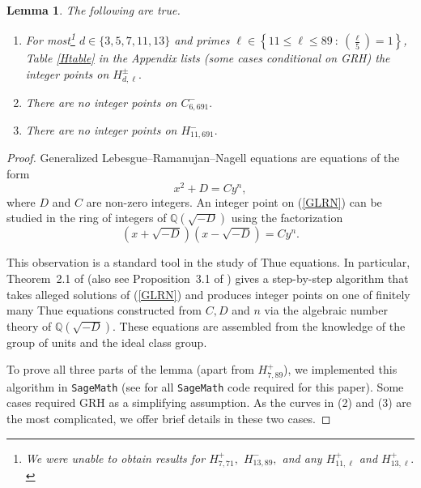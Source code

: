 \documentclass[12pt]{amsart}
\newtheorem{lem}{Lemma}[section]
\newcommand{\Q}{\mathbb{Q}}
\newcommand{\?}{\color{red}?}
\newcommand{\leg}[2]{\genfrac{(}{)}{}{}{#1}{#2}}
\numberwithin{equation}{section}
\begin{document}
\begin{lem}\label{Hyper11_19} The following are true.
\begin{enumerate}
\item
For most\footnote{We were unable to obtain results for $H_{7,71}^{+},$
$H_{13,89}^{-},$ and any $H^{+}_{11,\ell}$ and $H^{+}_{13,\ell}.$}
$d\in \{3, 5, 7, 11, 13\}$ and primes $\ell \in \left\{ 11\leq \ell \leq 89\ : \ \leg{\ell}{5}=1\right\}$,
Table \ref{Htable} in the Appendix lists (some cases conditional on GRH) the integer points on $H^{\pm}_{d,\ell}.$
\item There are no integer points on $C^{-}_{6,691}.$
\item There are no integer points on $H^{-}_{11,691}.$
\end{enumerate}
\end{lem}
\begin{proof}
Generalized Lebesgue--Ramanujan--Nagell equations are  equations of the form
\begin{equation}\label{GLRN}
x^2+D=Cy^n,
\end{equation}
where $D$ and $C$ are non-zero integers. An integer point on (\ref{GLRN}) can be studied in the ring of integers
of $\Q(\sqrt{-D})$
using the factorization
$$(x+\sqrt{-D})(x-\sqrt{-D}) =Cy^n.
$$

This observation is a standard tool in the study of Thue equations. In particular, 
Theorem~2.1 of  \cite{Barros} (also see Proposition~3.1 of \cite{BMS}) gives a step-by-step algorithm that takes alleged solutions of (\ref{GLRN}) and produces integer points on one
of finitely many Thue equations constructed from $C, D$ and $n$ via the algebraic number theory of $\Q(\sqrt{-D})$.
 These equations are assembled from the knowledge of the group of units and the
ideal class group.

To prove all three parts of the lemma (apart from $H_{7,89}^{+}$), we implemented this algorithm in \texttt{SageMath} (see \cite{github} for all \texttt{SageMath} code required for this paper). 
Some cases required GRH as a simplifying assumption. As the curves in (2) and (3) are the most complicated, we offer brief details in these two cases.


\end{proof}
\end{document}
